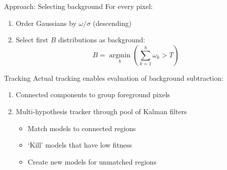\documentclass{beamer}
\DeclareMathOperator*{\argmin}{argmin}
\begin{document}
\begin{frame}{Approach: Selecting background}
For every pixel:
\begin{enumerate} 
  \item Order Gaussians by $\omega / \sigma$ (descending)
  \item Select first $B$ distributions as background:
  $$ B = \argmin\limits_b \left( \sum_{k=1}^b \omega_k > T \right)$$
\end{enumerate}
\end{frame}

\begin{frame}{Tracking}
Actual tracking enables evaluation of background subtraction:
\begin{enumerate}
  \item Connected components to group foreground pixels
  \item Multi-hypothesis tracker through pool of Kalman filters
  \begin{itemize}
    \item Match models to connected regions
    \item `Kill' models that have low fitness
    \item Create new models for unmatched regions
  \end{itemize}
\end{enumerate}
\end{frame}
\end{document}
